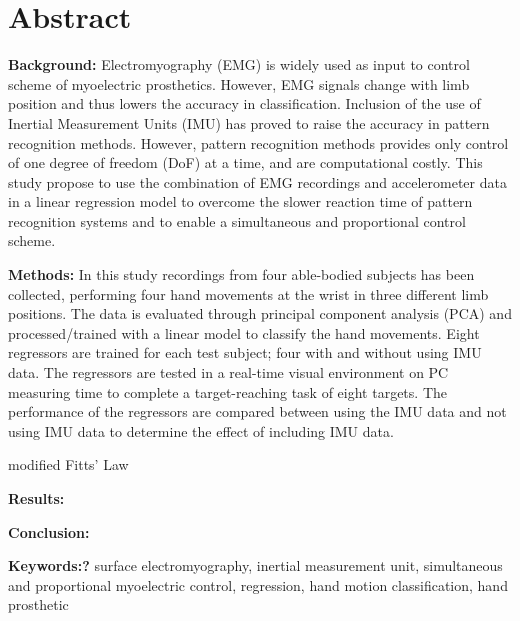 \section{Abstract}

\textbf{Background:} Electromyography (EMG) is widely used as input to control scheme of myoelectric prosthetics. However, EMG signals change with limb position and thus lowers the accuracy in classification.%
Inclusion of the use of Inertial Measurement Units (IMU) has proved to raise the accuracy in pattern recognition methods. However, pattern recognition methods provides only control of one degree of freedom (DoF) at a time, and are computational costly. This study propose to use the combination of EMG recordings and accelerometer data in a linear regression model to overcome the slower reaction time of pattern recognition systems and to enable a simultaneous and proportional control scheme. 


\textbf{Methods:} In this study recordings from four able-bodied subjects has been collected, performing four hand movements at the wrist in three different limb positions. The data is evaluated through principal component analysis (PCA) and processed/trained with a linear model to classify the hand movements. Eight regressors are trained for each test subject; four with and without using IMU data. The regressors are tested in a real-time visual environment on PC measuring time to complete a target-reaching task of eight targets. The performance of the regressors are compared between using the IMU data and not using IMU data to determine the effect of including IMU data. 


modified Fitts' Law 


\textbf{Results:} 


\textbf{Conclusion:} 


\textbf{Keywords:?} surface electromyography, inertial measurement unit, simultaneous and proportional myoelectric control, regression, hand motion classification, hand prosthetic
